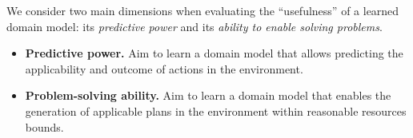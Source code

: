 \documentclass{article}
\theoremstyle{definition}
\theoremstyle{remark}
\newif\ifaddcomments
\newcommand{\roni}[1]{\ifaddcomments{\textcolor{red}{[Roni: #1]}}\fi}
\newcommand{\mauro}[1]{\ifaddcomments{\textcolor{green}{[Mauro: #1]}}\fi}
\newcommand{\gregor}[1]{\ifaddcomments{\textcolor{orange}{[Gregor: #1]}}\fi}
\begin{document}
\gregor{One general problem: the syntactic metrics all work solely on the level of the domain representation. But the metrics we propose here all require some type of actual states -- i.e.\ they are dependent on at least the set of objects that exists. Or even more they are dependent on the full problem instances. I assume we then have a selection of ``test'' problem instances as in standard machine learning?}
We consider two main dimensions when evaluating the ``usefulness'' of a learned domain model: its \emph{predictive power} and its \emph{ability to enable solving problems}.
%
\begin{itemize}
    \item \textbf{Predictive power.} Aim to learn a domain model that allows predicting the applicability and outcome of actions in the environment. 
    \item \textbf{Problem-solving ability.} Aim to learn a domain model that enables the generation of applicable plans in the environment within reasonable resources bounds. %
\end{itemize}

\end{document}
